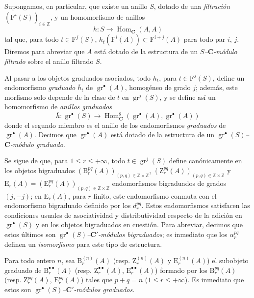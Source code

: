 \begin{env}[13.6.6]
\label{0.13.6.6}
\label{0.13.6.6-fr}
Supongamos, en particular, que existe un anillo $S$, dotado de una
\emph{filtración} $(\mathrm F^i(S))_{i\in\mathbb Z}$, y un homomorfismo
de anillos
\begin{equation}
\label{0.13.6.6.1-fr}
\tag{13.6.6.1}
h:S\to\operatorname{Hom}_{\boldsymbol{C}}(A,A)
\end{equation}
tal que, para todo $t\in\mathrm F^j(S)$,
$h_t(\mathrm F^i(A))\subset\mathrm F^{i+j}(A)$ para todo par $i$, $j$. Diremos para abreviar que $A$ está dotado de la estructura de un
\emph{$S$--$\boldsymbol{C}$-módulo filtrado} sobre el anillo filtrado $S$.

Al pasar a los objetos graduados asociados, todo $h_t$, para
$t\in\mathrm F^j(S)$, define un endomorfismo \emph{graduado}
$\overline h_t$ de $\operatorname{gr}^\bullet(A)$, homogéneo de grado $j$; además, este morfismo solo depende de la clase de $t$ en $\operatorname{gr}^j(S)$, y se define así un homomorfismo de \emph{anillos graduados} \[
\overline h:\operatorname{gr}^\bullet(S)\to
\operatorname{Hom}_{\boldsymbol{C}}^g(\operatorname{gr}^\bullet(A),
\operatorname{gr}^\bullet(A))
\] donde el segundo miembro es el anillo de los endomorfismos \emph{graduados} de $\operatorname{gr}^\bullet(A)$.
Decimos que $\operatorname{gr}^\bullet(A)$ está dotado de la estructura
de un \emph{$\operatorname{gr}^\bullet(S)$--$\boldsymbol{C}$-módulo graduado}.

Se sigue de  que, para
$1\leq r\leq+\infty$, todo $\overline t\in\operatorname{gr}^j(S)$ define canónicamente en los objetos bigraduados $(\mathrm B_r^{pq}(A))_{(p,q)\in\mathbb Z\times\mathbb Z}$, $(\mathrm Z_r^{pq}(A))_{(p,q)\in\mathbb Z\times\mathbb Z}$ y $\mathrm E_r(A)=(\mathrm E_r^{pq}(A))_{(p,q)\in\mathbb Z\times\mathbb Z}$ endomorfismos bigraduados de grados $(j,-j)$; en $\mathrm E_r(A)$, para $r$ finito, este endomorfismo conmuta con
el endomorfismo bigraduado definido por los $d_r^{pq}$.
Estos endomorfismos satisfacen las condiciones usuales de asociatividad y
distributividad respecto de la adición en
$\operatorname{gr}^\bullet(S)$ y en los objetos bigraduados en cuestión.
Para abreviar, decimos que estos últimos son
\emph{$\operatorname{gr}^\bullet(S)$--$\boldsymbol{C}'$-módulos bigraduados};
es inmediato que los $\alpha_r^{pq}$ definen un \emph{isomorfismo} para
este tipo de estructura.

Para todo entero $n$, sea $\mathrm B_r^{(n)}(A)$
(resp. $\mathrm Z_r^{(n)}(A)$ y
$\mathrm E_r^{(n)}(A)$) el subobjeto graduado de $\mathrm B_r^{\bullet\bullet}(A)$ (resp. $\mathrm Z_r^{\bullet\bullet}(A)$, $\mathrm E_r^{\bullet\bullet}(A)$) formado por los $\mathrm B_r^{pq}(A)$ (resp. $\mathrm Z_r^{pq}(A)$, $\mathrm E_r^{pq}(A)$) tales que $p+q=n$ ($1\leq r\leq+\infty$).
Es inmediato que estos son
\emph{$\operatorname{gr}^\bullet(S)$--$\boldsymbol{C}'$-módulos graduados}.


\end{env}
